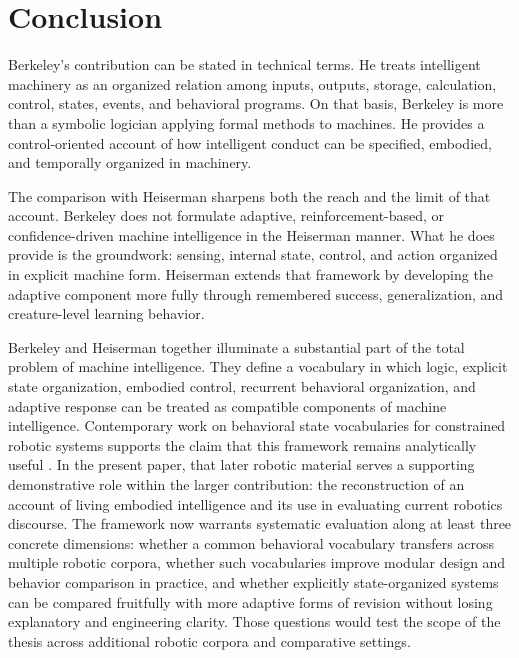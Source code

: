 \documentclass[11pt]{article}
\begin{document}
\section{Conclusion}
\enlargethispage{\baselineskip}

Berkeley's contribution can be stated in technical terms. He treats intelligent machinery as an
organized relation among inputs, outputs, storage, calculation, control, states, events, and
behavioral programs. On that basis, Berkeley is more than a symbolic logician applying formal
methods to machines. He provides a control-oriented account of how intelligent conduct can be
specified, embodied, and temporally organized in machinery.

The comparison with Heiserman sharpens both the reach and the limit of that account. Berkeley
does not formulate adaptive, reinforcement-based, or confidence-driven machine intelligence in the
Heiserman manner. What he does provide is the groundwork: sensing, internal state, control, and
action organized in explicit machine form. Heiserman extends that framework by developing the
adaptive component more fully through remembered success, generalization, and creature-level
learning behavior.

Berkeley and Heiserman together illuminate a substantial part of the total problem of machine
intelligence. They define a vocabulary in which logic, explicit state organization, embodied
control, recurrent behavioral organization, and adaptive response can be treated as compatible
components of machine intelligence. Contemporary work on behavioral state vocabularies for
constrained robotic systems supports the claim that this framework remains analytically useful
\citep{tucker2026behavioral}. In the present paper, that later robotic material serves a supporting
demonstrative role within the larger contribution: the reconstruction of an account of living
embodied intelligence and its use in evaluating current robotics discourse. The framework now warrants
systematic evaluation along at least
three concrete dimensions: whether a common behavioral vocabulary transfers across multiple robotic
corpora, whether such vocabularies improve modular design and behavior comparison in practice, and
whether explicitly state-organized systems can be compared fruitfully with more adaptive forms of
revision without losing explanatory and engineering clarity. Those questions would test the scope
of the thesis across additional robotic corpora and comparative settings.
\end{document}
